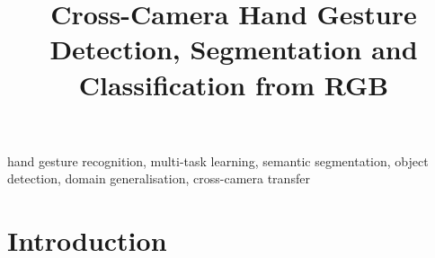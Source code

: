 \documentclass[conference]{IEEEtran}
\begin{document}
\title{Cross-Camera Hand Gesture Detection, Segmentation and Classification from RGB}

\author{
}

\maketitle

\begin{abstract}
\end{abstract}

\begin{IEEEkeywords}
hand gesture recognition, multi-task learning, semantic segmentation, object detection,
domain generalisation, cross-camera transfer
\end{IEEEkeywords}

\section{Introduction}
\end{document}
